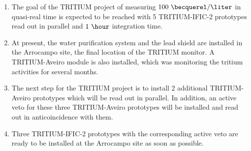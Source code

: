 \begin{enumerate}
\item{} The goal of the TRITIUM project of measuring $100~\becquerel/\liter$ in quasi-real time is expected to be reached with 5 TRITIUM-IFIC-2 prototypes read out in parallel and $1~\hour$ integration time.

\item{} At present, the water purification system and the lead shield are installed in the Arrocampo site, the final location of the TRITIUM monitor. A TRITIUM-Aveiro module is also installed, which was monitoring the tritium activities for several months. 

\item{} The next step for the TRITIUM project is to install 2 additional TRITIUM-Aveiro prototypes which will be read out in parallel. In addition, an active veto for these three TRITIUM-Aveiro prototypes will be installed and read out in anticoincidence with them. 

\item{} Three TRITIUM-IFIC-2 prototypes with the corresponding active veto are ready to be installed at the Arrocampo site as soon as possible.


\end{enumerate}

